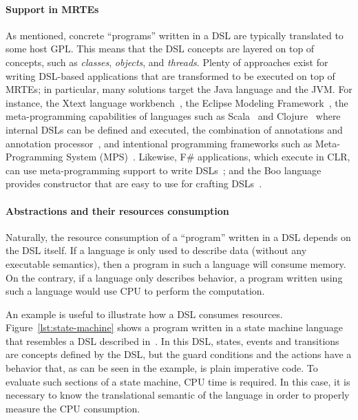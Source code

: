 \paragraph{Support in MRTEs} 
As mentioned, concrete ``programs'' written in a DSL are typically translated to some host GPL.
This means that the DSL concepts are layered on top of concepts, such as \textit{classes}, \textit{objects}, and \textit{threads}.
Plenty of approaches exist for writing DSL-based applications that are transformed to be executed on top of MRTEs; in particular, many solutions target the Java language and the JVM.
For instance, the Xtext language workbench~\cite{Eysholdt:2010:XIY:1869542.1869625}, the Eclipse Modeling Framework~\cite{EMFModeling}, the meta-programming capabilities of languages such as Scala~\cite{Hofer:2010:MDL:1868294.1868307} and Clojure~\cite{Kelker2013} where internal DSLs can be defined and executed, the combination of annotations and annotation processor~\cite{Huang2008}, and intentional programming frameworks such as Meta-Programming System (MPS)~\cite{JetBrainsMetaProgrammingSystem(MPS),Voelter2014}.
Likewise, F\# applications, which execute in CLR, can use meta-programming support to write DSLs~\cite{Cheney:2013:PTL:2500365.2500586}; and the Boo language provides constructor that are easy to use for crafting DSLs~\cite{Rahien2010}. 

\paragraph{Abstractions and their resources consumption} 
Naturally, the resource consumption of a ``program'' written in a DSL depends on the DSL itself.
If a language is only used to describe data (without any executable semantics), then a program in such a language will consume memory.
On the contrary, if a language only describes behavior, a program written using such a language would use CPU to perform the computation.

An example is useful to illustrate how a DSL consumes resources.
Figure~\ref{lst:state-machine} shows a program written in a state machine language that resembles a DSL described in~\cite{Voelter2010}.
In this DSL, states, events and transitions are concepts defined by the DSL, but the guard conditions and the actions have a behavior that, as can be seen in the example, is plain imperative code.
To evaluate such sections of a state machine, CPU time is required.
In this case, it is necessary to know the translational semantic of the language in order to properly measure the CPU consumption.

